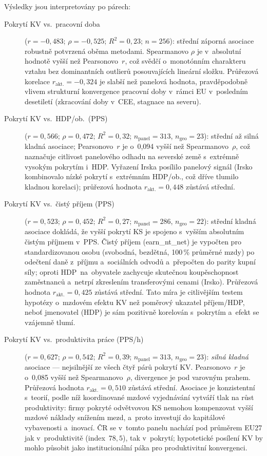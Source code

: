 Výsledky jsou interpretovány po párech:
\begin{description}
  \item[Pokrytí \ac{KV} vs.\ pracovní doba]
    ($r = -0{,}483$; $\rho = -0{,}525$; $R^2 = 0{,}23$; $n = 256$):
    střední záporná asociace robustně potvrzená oběma metodami.
    Spearmanovo $\rho$ je v~absolutní hodnotě vyšší než Pearsonovo~$r$, což svědčí o~monotónním charakteru vztahu bez dominantních outlierů posouvajících lineární složku.
    Průřezová korelace $r_{\text{akt.}} = -0{,}324$ je slabší než panelová hodnota, pravděpodobně vlivem strukturní konvergence pracovní doby v~rámci EU v~posledním desetiletí (zkracování doby v~CEE, stagnace na severu).

  \item[Pokrytí \ac{KV} vs.\ HDP/ob.\ (PPS)]
    ($r = 0{,}566$; $\rho = 0{,}472$; $R^2 = 0{,}32$; $n_{\text{panel}} = 313$, $n_{\text{geo}} = 23$):
    střední až silná kladná asociace; Pearsonovo~$r$ je o~0,094 vyšší než Spearmanovo~$\rho$, což naznačuje citlivost panelového odhadu na severské země s~extrémně vysokým pokrytím i~HDP.
    Vyřazení Irska posílilo panelový signál (Irsko kombinovalo nízké pokrytí s~extrémním HDP/ob., což dříve tlumilo kladnou korelaci); průřezová hodnota $r_{\text{akt.}} = 0{,}448$ zůstává střední.

  \item[Pokrytí \ac{KV} vs.\ čistý příjem (PPS)]
    ($r = 0{,}523$; $\rho = 0{,}452$; $R^2 = 0{,}27$; $n_{\text{panel}} = 286$, $n_{\text{geo}} = 22$):
    střední kladná asociace dokládá, že vyšší pokrytí \ac{KS} je spojeno s~vyšším absolutním čistým příjmem v~PPS.
    Čistý příjem (earn\_nt\_net) je vypočten pro standardizovanou osobu (svobodná, bezdětná, 100\,\% průměrné mzdy) po odečtení daně z~příjmu a~sociálních odvodů a~přepočten do parity kupní síly; oproti HDP~na~obyvatele zachycuje skutečnou koupěschopnost zaměstnanců a~netrpí zkreslením transferovými cenami (Irsko).
    Průřezová hodnota $r_{\text{akt.}} = 0{,}425$ zůstává střední.
    Tato míra je citlivějším testem hypotézy o~mzdovém efektu \ac{KV} než poměrový ukazatel příjem/HDP, neboť jmenovatel (HDP) je sám pozitivně korelován s~pokrytím a~efekt se vzájemně tlumí.

  \item[Pokrytí \ac{KV} vs.\ produktivita práce (PPS/h)]
    ($r = 0{,}627$; $\rho = 0{,}542$; $R^2 = 0{,}39$; $n_{\text{panel}} = 313$, $n_{\text{geo}} = 23$):
    \emph{silná kladná} asociace --- nejsilnější ze všech čtyř párů pokrytí \ac{KV}.
    Pearsonovo~$r$ je o~0,085 vyšší než Spearmanovo~$\rho$, divergence je pod varovným prahem.
    Průřezová hodnota $r_{\text{akt.}} = 0{,}510$ zůstává střední.
    Asociace je konzistentní s~teorií, podle níž koordinované mzdové vyjednávání vytváří tlak na růst produktivity: firmy pokryté odvětvovou \ac{KS} nemohou kompenzovat vyšší mzdové náklady snížením mezd, a~proto investují do kapitálové vybavenosti a~inovací.
    ČR se v~tomto panelu nachází pod průměrem EU27 jak v~produktivitě (index~$78{,}5$), tak v~pokrytí; hypotetické posílení \ac{KV} by mohlo působit jako institucionální páka pro produktivitní konvergenci.


\end{description}

